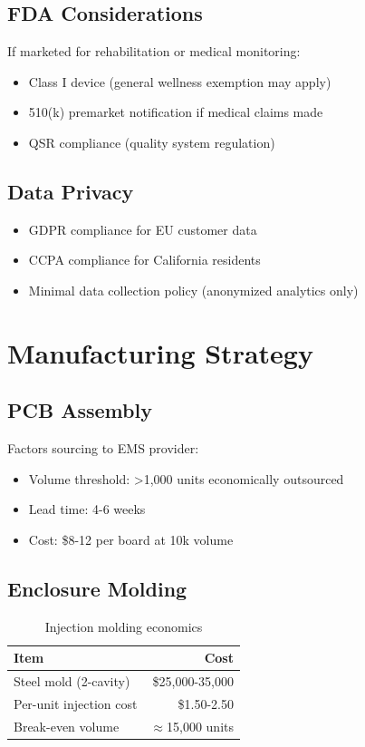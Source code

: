 \subsection{FDA Considerations}

If marketed for rehabilitation or medical monitoring:
\begin{itemize}
    \item Class I device (general wellness exemption may apply)
    \item 510(k) premarket notification if medical claims made
    \item QSR compliance (quality system regulation)
\end{itemize}

\subsection{Data Privacy}

\begin{itemize}
    \item GDPR compliance for EU customer data
    \item CCPA compliance for California residents
    \item Minimal data collection policy (anonymized analytics only)
\end{itemize}

\section{Manufacturing Strategy}

\subsection{PCB Assembly}

Factors sourcing to EMS provider:
\begin{itemize}
    \item Volume threshold: \textgreater 1,000 units economically outsourced
    \item Lead time: 4-6 weeks
    \item Cost: \$8-12 per board at 10k volume
\end{itemize}

\subsection{Enclosure Molding}

\begin{table}[h]
    \centering
    \caption{Injection molding economics}
    \label{tab:molding_costs}
    \begin{tabular}{lr}
        \toprule
        \textbf{Item} & \textbf{Cost} \\
        \midrule
        Steel mold (2-cavity) & \$25,000-35,000 \\
        Per-unit injection cost & \$1.50-2.50 \\
        Break-even volume & $\approx$15,000 units \\
        \bottomrule
    \end{tabular}
\end{table}

